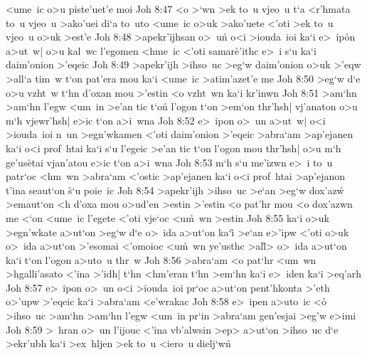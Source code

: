 <ume~ic
o>u
piste'uet'e
moi\bibvsend
\vs Joh 8:47
<o
>`wn
>ek
to~u
vjeo~u
t`a
<r'hmata
to~u
vjeo~u
>ako'uei
di`a
to~uto
<ume~ic
o>uk
>ako'uete
<'oti
>ek
to~u
vjeo~u
o>uk
>est'e\bibvsend
\vs Joh 8:48
>apekr'ijhsan
o>~u\r{n}
o<i
>iouda~ioi
ka`i
e>~ip\r{o}n
a>ut~w|
o>u
kal~wc
l'egomen
<hme~ic
<'oti
samar\r{e}'ithc
e>~i
s`u
ka`i
daim'onion
>'eqeic\bibvsend
\vs Joh 8:49
>apekr'ijh
>ihso~uc
>eg`w
daim'onion
o>uk
>'eqw
>all`a
tim~w
t`on
pat'era
mou
ka`i
<ume~ic
>atim'azet'e
me\bibvsend
\vs Joh 8:50
>eg`w
d`e
o>u
vzht~w
t`hn
d'oxan
mou
>'estin
<o
vzht~wn
ka`i
kr'inwn\bibvsend
\vs Joh 8:51
>am`hn
>am`hn
l'egw
<um~in
>e'an
tic
t`on\r{}
l'ogon
t`on
>em`on
thr'hsh|
vj'anaton
o>u
m`h
vjewr'hsh|
e>ic
t`on
a>i~wna\bibvsend
\vs Joh 8:52
e>~ipon
o>~un
a>ut~w|
o<i
>iouda~ioi
n~un
>egn'wkamen
<'oti
daim'onion
>'eqeic
>abra`am
>ap'ejanen
ka`i
o<i
prof~htai
ka`i
s`u
l'egeic
>e'an
tic
t`on
l'ogon
mou
thr'hsh|
o>u
m`h
ge'us\r{e}tai
vjan'atou
e>ic
t`on
a>i~wna\bibvsend
\vs Joh 8:53
m`h
s`u
me'izwn
e>~i
to~u
patr`oc
<hm~wn
>abra`am
<'ostic
>ap'ejanen
ka`i
o<i
prof~htai
>ap'ejanon
t'ina
seaut`on
\r{s}`u
poie~ic\bibvsend
\vs Joh 8:54
>apekr'ijh
>ihso~uc
>e`an
>eg`w
dox'az\r{w}
>emaut`on
<h
d'oxa
mou
o>ud'en
>estin
>'estin
<o
pat'hr
mou
<o
dox'azwn
me
<`on
<ume~ic
l'egete
<'oti
vje`oc
<u\r{m}~wn
>estin\bibvsend
\vs Joh 8:55
ka`i
o>uk
>egn'wkate
a>ut`on
>eg`w
d`e
o>~ida
a>ut`on
ka`i\r{}
>e`an
e>'ipw
<'oti
o>uk
o>~ida
a>ut`on
>'esomai
<'omoioc
<u\r{m}~wn
ye'usthc
>al\r{l}>
o>~ida
a>ut`on
ka`i
t`on
l'ogon
a>uto~u
thr~w\bibvsend
\vs Joh 8:56
>abra`am
<o
pat`hr
<um~wn
>hgalli'asato
<'ina
>'idh|
t`hn
<hm'eran
t`hn
>em`hn
ka`i
e>~iden
ka`i
>eq'arh\bibvsend
\vs Joh 8:57
e>~ipon
o>~un
o<i
>iouda~ioi
pr`oc
a>ut`on
pent'hkonta
>'eth
o>'upw
>'eqeic
ka`i
>abra`am
<e'wrakac\bibvsend
\vs Joh 8:58
e>~ipen
a>uto~ic
<o\r{}
>ihso~uc
>am`hn
>am`hn
l'egw
<um~in
pr`in
>abra`am
gen'esjai
>eg'w
e>imi\bibvsend
\vs Joh 8:59
>~hran
o>~un
l'ijouc
<'ina
vb'alwsin
>ep>
a>ut`on
>ihso~uc
d`e
>ekr'ubh
ka`i
>ex~hljen
>ek
to~u
<iero~u
dielj`wn\r{}
